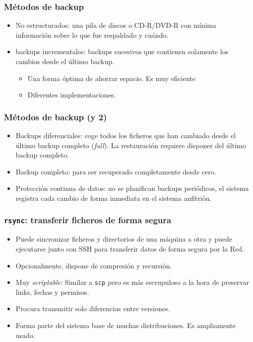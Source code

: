 \documentclass{beamer}
\begin{document}
\begin{frame}
  \frametitle{Métodos de backup}
  \begin{itemize}
    \item \alert{No estructurados:} una pila de discos o CD-R/DVD-R con mínima información sobre lo que fue respaldado y cuándo. 
    \item \alert{backups incrementales:} backups sucesivos que contienen solamente los cambios desde el último backup.
	  \begin{itemize}
		\item Una forma óptima de ahorrar espacio. Es muy eficiente
		\item Diferentes implementaciones.
	  \end{itemize}
  \end{itemize}
\end{frame}

\begin{frame}
  \frametitle{Métodos de backup (y 2)}
  \begin{itemize}
    \item \alert{Backups diferenciales:} coge todos los ficheros que han cambiado desde el último backup completo (\textit{full}). La restauración requiere disponer del último backup completo.
    \item \alert{Backup completo:} para ser recuperado completamente desde cero. 
    \item \alert{Protección continua de datos:} no se planifican backups periódicos, el sistema registra cada cambio de forma inmediata en el sistema anfitrión.
  \end{itemize}
\end{frame}



\begin{frame}
  \frametitle{\texttt{rsync}: transferir ficheros de forma segura}
  \begin{itemize}
    \item Puede sincronizar ficheros y directorios de una máquina a otra y puede ejecutarse junto con SSH para transferir datos de forma segura por la Red.
    \item Opcionalmente, dispone de compresión y recursión.
    \item Muy \textit{scriptable}: Similar a \texttt{scp} pero es más escrupuloso a la hora de preservar links, fechas y permisos.
    \item Procura transmitir solo diferencias entre versiones.
    \item Forma parte del sistema base de muchas distribuciones. Es ampliamente usado.
  \end{itemize}
\end{frame}
\end{document}
